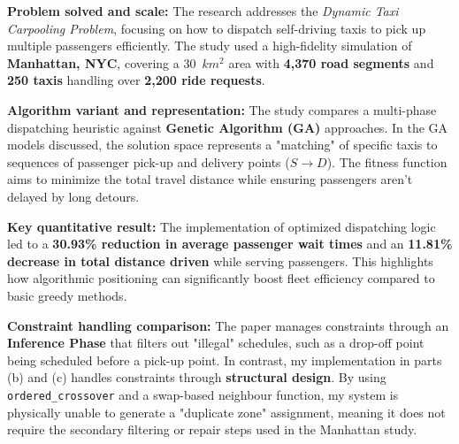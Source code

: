 \documentclass[12pt,a4paper]{article}
\begin{document}
\medskip
\textbf{Problem solved and scale:} 
The research addresses the \textit{Dynamic Taxi Carpooling Problem}, focusing on how to dispatch self-driving taxis to pick up multiple passengers efficiently. The study used a high-fidelity simulation of \textbf{Manhattan, NYC}, covering a 30~$km^2$ area with \textbf{4,370 road segments} and \textbf{250 taxis} handling over \textbf{2,200 ride requests}.

\textbf{Algorithm variant and representation:} 
The study compares a multi-phase dispatching heuristic against \textbf{Genetic Algorithm (GA)} approaches. In the GA models discussed, the solution space represents a "matching" of specific taxis to sequences of passenger pick-up and delivery points ($S \rightarrow D$). The fitness function aims to minimize the total travel distance while ensuring passengers aren't delayed by long detours.

\textbf{Key quantitative result:} 
The implementation of optimized dispatching logic led to a \textbf{30.93\% reduction in average passenger wait times} and an \textbf{11.81\% decrease in total distance driven} while serving passengers. This highlights how algorithmic positioning can significantly boost fleet efficiency compared to basic greedy methods.

\textbf{Constraint handling comparison:} 
The paper manages constraints through an \textbf{Inference Phase} that filters out "illegal" schedules, such as a drop-off point being scheduled before a pick-up point. In contrast, my implementation in parts (b) and (c) handles constraints through \textbf{structural design}. By using \texttt{ordered\_crossover} and a swap-based neighbour function, my system is physically unable to generate a "duplicate zone" assignment, meaning it does not require the secondary filtering or repair steps used in the Manhattan study.
\end{document}

